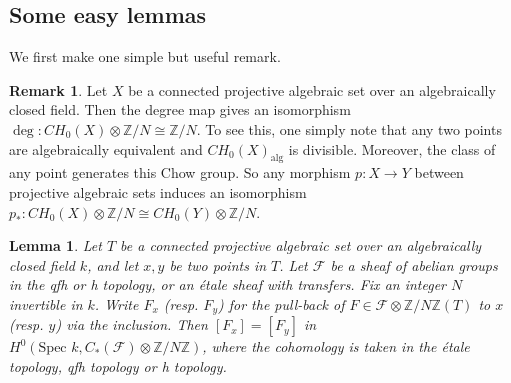 \documentclass{amsart}
\newtheorem{lem}[theorem]{Lemma}
\theoremstyle{definition}
\newtheorem{rem}[theorem]{Remark}
\theoremstyle{remark}
\newcommand{\mbb}{\mathbb}
\newcommand{\ZZ}{\mbb{Z}}
\newcommand{\SP}{\text{Spec }}
\begin{document}
\subsection{Some easy lemmas}
We first make one simple but useful remark. 
\begin{rem}\label{rem:ch0}
    Let $X$ be a connected projective algebraic set over an algebraically closed field. Then the degree map gives an isomorphism $\deg: CH_0(X)\otimes \ZZ/N\cong \ZZ/N$. 
To see this, one simply note that any two points are algebraically equivalent and $CH_0(X)_\text{alg}$ is divisible. 
Moreover, the class of any point generates this Chow group.  
So any morphism $p: X \to Y$ between projective algebraic sets induces an isomorphism $p_*:CH_0(X)\otimes \ZZ/N\cong CH_0(Y)\otimes \ZZ/N$.

\end{rem}
\begin{lem}\label{lem:curve_vanishing}
Let $T$ be a connected projective algebraic set over an algebraically closed field $k$, and let $x, y$ be two points in $T$. Let $\mathcal{F}$ be a sheaf of abelian groups in the qfh or h topology, or an \'etale sheaf with transfers.
Fix an integer $N$ invertible in $k$.
Write $F_x$ (resp. $F_y$) for the pull-back of $F \in \mathcal{F} \otimes \ZZ/N \ZZ (T)$ to $x$ (resp. $y$) via the inclusion. Then $[F_x]=[F_y]$ in $H^0(\SP k, C_*(\mathcal{F})\otimes \ZZ/N \ZZ)$, where the cohomology is taken in the \'etale topology, qfh topology or h topology.
\end{lem}
\end{document}
